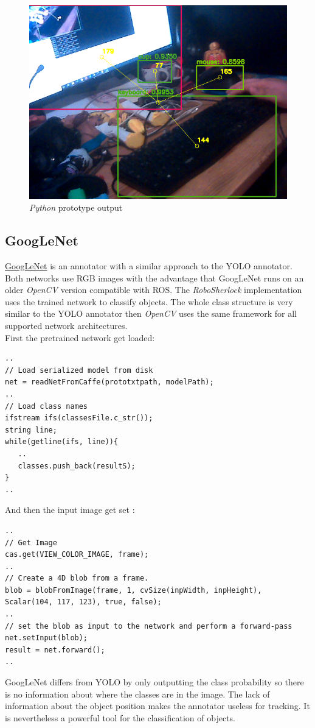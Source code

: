 \documentclass[main.tex]{subfiles}
\begin{document}
\begin{figure}[H]
\centering
\includegraphics[width=1\textwidth]{pictures/perception/YOLO.png}
\caption{\textit{Python} prototype output}
\end{figure}

                \subsection{GoogLeNet}
\href{https://github.com/SUTURO/suturo_perception/blob/Handcamera_tracking/rs_Athene/src/GoogLeNet.cpp}{GoogLeNet} is an annotator with a similar approach to the YOLO annotator. Both networks use RGB images with the advantage that GoogLeNet runs on an older \textit{OpenCV} version compatible with ROS.
The \textit{RoboSherlock} implementation uses the trained network to classify objects. The whole class structure is very similar to the YOLO annotator then \textit{OpenCV} uses the same framework for all supported network architectures. \\
First the pretrained network get loaded: 
\begin{lstlisting}
.. 
// Load serialized model from disk
net = readNetFromCaffe(prototxtpath, modelPath);
..
// Load class names 
ifstream ifs(classesFile.c_str());
string line;
while(getline(ifs, line)){
   ..
   classes.push_back(resultS);
}
..
\end{lstlisting}
And then the input image get set : 
\begin{lstlisting}
..
// Get Image 
cas.get(VIEW_COLOR_IMAGE, frame);
..
// Create a 4D blob from a frame.
blob = blobFromImage(frame, 1, cvSize(inpWidth, inpHeight), Scalar(104, 117, 123), true, false);
..
// set the blob as input to the network and perform a forward-pass
net.setInput(blob);
result = net.forward();
..
\end{lstlisting}
GoogLeNet differs from YOLO by only outputting the class probability so there is no information about where the classes are in the image. The lack of information about the object position makes the annotator useless for tracking. It is nevertheless a powerful tool for the classification of objects. 
\end{document}
